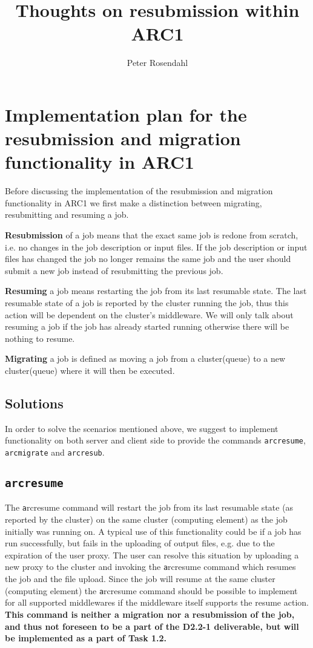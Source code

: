 \documentclass[12pt,oneside,a4paper,english]{article}
\title{Thoughts on resubmission within ARC1}
\author{Peter Rosendahl}
\begin{document}
\section*{Implementation plan for the resubmission and migration functionality in ARC1}
Before discussing the implementation of the resubmission and migration functionality in ARC1 we first make a distinction between migrating, resubmitting and resuming a job.

{\bf Resubmission} of a job means that the exact same job is redone from scratch, i.e. no changes in the job description or input files. If the job description or input files has changed the job no longer remains the same job and the user should submit a new job instead of resubmitting the previous job.

{\bf Resuming} a job means restarting the job from its last resumable state. The last resumable state of a job is reported by the cluster running the job, thus this action will be dependent on the cluster's middleware. We will only talk about resuming a job if the job has already started running otherwise there will be nothing to resume.

{\bf Migrating} a job is defined as moving a job from a cluster(queue) to a new cluster(queue) where it will then be executed. 

\subsection*{Solutions}
In order to solve the scenarios mentioned above, we suggest to implement functionality on both server and client side to provide the commands \texttt{arcresume}, \texttt{arcmigrate} and \texttt{arcresub}.

\subsection*{\texttt{arcresume}}
The {\texttt arcresume} command will restart the job from its last resumable state (as reported by the cluster) on the same cluster (computing element) as the job initially was running on. A typical use of this functionality could be if a job has run successfully, but fails in the uploading of output files, e.g. due to the expiration of the user proxy. The user can resolve this situation by uploading a new proxy to the cluster and invoking the {\texttt arcresume} command which resumes the job and the file upload. Since the job will resume at the same cluster (computing element) the {\texttt arcresume} command should be possible to implement for all supported middlewares if the middleware itself supports the resume action. {\bf This command is neither a migration nor a resubmission of the job, and thus not foreseen to be a part of the D2.2-1 deliverable, but will be implemented as a part of Task 1.2.}
\end{document}
